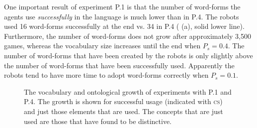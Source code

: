 One important result of experiment P.1 is that the number of word-forms the agents use {\em successfully} in the language is much lower than in P.4. The robots used 16 word-forms successfully at the end vs. 34 in P.4 ( (a), solid lower line). Furthermore, the number of word-forms does not grow after approximately 3,500 games, whereas the vocabulary size increases until the end when $P_s=0.4$. The number of word-forms that have been created by the robots is only slightly above the number of word-forms that have been successfully used. Apparently the robots tend to have more time to adopt word-forms correctly when $P_s=0.1$. 


\begin{figure}
\centering
{}
\caption{The vocabulary and ontological growth of experiments with P.1 and P.4. The growth is shown for successful usage (indicated with {\scshape cs}) and just those elements that are used. The concepts that are just used are those that have found to be distinctive.}
\label{f:opt:words}
\end{figure}

